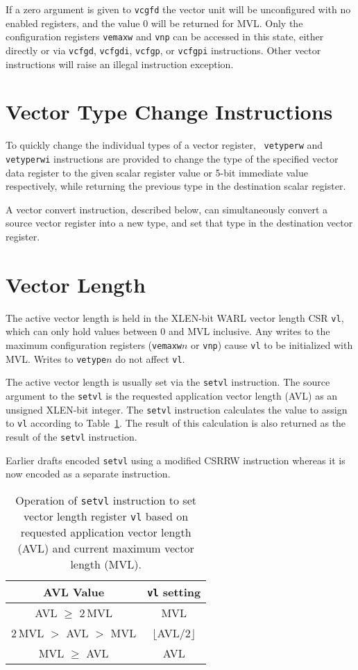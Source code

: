 If a zero argument is given to {\tt vcgfd} the vector unit will be
unconfigured with no enabled registers, and the value 0 will be
returned for MVL.  Only the configuration registers {\tt vemaxw} and
{\tt vnp} can be accessed in this state, either directly or via
{\tt vcfgd}, {\tt vcfgdi}, {\tt vcfgp}, or {\tt vcfgpi}
instructions. Other vector instructions will raise an illegal
instruction exception.

\section{Vector Type Change Instructions}

To quickly change the individual types of a vector register, {\tt
  vetyperw} and {\tt vetyperwi} instructions are provided to change
the type of the specified vector data register to the given scalar
register value or 5-bit immediate value respectively, while returning
the previous type in the destination scalar register.

A vector convert instruction, described below, can simultaneously
convert a source vector register into a new type, and set that type in
the destination vector register.

\section{Vector Length}

The active vector length is held in the XLEN-bit WARL vector length
CSR {\tt vl}, which can only hold values between 0 and MVL inclusive.
Any writes to the maximum configuration registers ({\tt vemaxw}$n$ or
{\tt vnp}) cause {\tt vl} to be initialized with MVL.  Writes to
{\tt vetype}$n$ do not affect {\tt vl}.

The active vector length is usually set via the {\tt setvl}
instruction.  The source argument to the {\tt setvl} is the requested
application vector length (AVL) as an unsigned XLEN-bit integer. The
{\tt setvl} instruction calculates the value to assign to {\tt vl}
according to Table~\ref{tab:vlcalc}.  The result of this calculation
is also returned as the result of the {\tt setvl} instruction.

\begin{commentary}
Earlier drafts encoded {\tt setvl} using a modified CSRRW instruction
whereas it is now encoded as a separate instruction.
\end{commentary}

\begin{table}
  \centering
  \begin{tabular}{|c|c|}
    \hline
    AVL Value & {\tt vl} setting \\
    \hline
    AVL $\geq$ 2\,MVL & MVL \\
    2\,MVL $>$ AVL $>$ MVL & $\lfloor$AVL$/2\rfloor$ \\
    MVL $\geq$ AVL & AVL \\
    \hline
  \end{tabular}
  \caption{Operation of {\tt setvl} instruction to set vector
    length register {\tt vl} based on requested application vector
    length (AVL) and current maximum vector length (MVL).}
  \label{tab:vlcalc}
\end{table}

